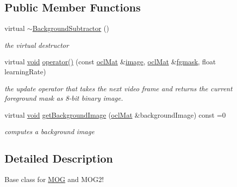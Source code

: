 \subsection*{Public Member Functions}
\begin{DoxyCompactItemize}
\item 
virtual \hyperlink{classcv_1_1ocl_1_1BackgroundSubtractor_a4039b4b467e3291bc407cda0f6338985}{$\sim$\-Background\-Subtractor} ()
\begin{DoxyCompactList}\small\item\em the virtual destructor \end{DoxyCompactList}\item 
virtual \hyperlink{legacy_8hpp_a8bb47f092d473522721002c86c13b94e}{void} \hyperlink{classcv_1_1ocl_1_1BackgroundSubtractor_ab8110c1e077b13a09fb2abb281d1edc2}{operator()} (const \hyperlink{classcv_1_1ocl_1_1oclMat}{ocl\-Mat} \&\hyperlink{legacy_8hpp_ad62b16ab219ae2483e8a3d921c44cc97}{image}, \hyperlink{classcv_1_1ocl_1_1oclMat}{ocl\-Mat} \&\hyperlink{legacy_8hpp_a7ff9edf5eaa300d3c1cea7de20631fd8}{fgmask}, float learning\-Rate)
\begin{DoxyCompactList}\small\item\em the update operator that takes the next video frame and returns the current foreground mask as 8-\/bit binary image. \end{DoxyCompactList}\item 
virtual \hyperlink{legacy_8hpp_a8bb47f092d473522721002c86c13b94e}{void} \hyperlink{classcv_1_1ocl_1_1BackgroundSubtractor_ab58feb8db76e348a3ce4bceabecb3903}{get\-Background\-Image} (\hyperlink{classcv_1_1ocl_1_1oclMat}{ocl\-Mat} \&background\-Image) const =0
\begin{DoxyCompactList}\small\item\em computes a background image \end{DoxyCompactList}\end{DoxyCompactItemize}


\subsection{Detailed Description}
Base class for \hyperlink{classcv_1_1ocl_1_1MOG}{M\-O\-G} and M\-O\-G2! 

